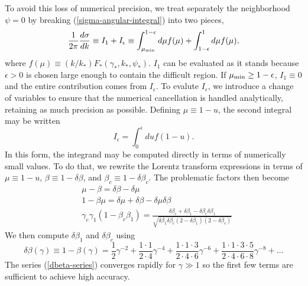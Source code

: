 \documentclass[12pt]{article}
\begin{document}
To avoid this loss of numerical precision, we treat
separately the neighborhood $\psi = 0$ by
breaking (\ref{sigma-angular-integral}) into two pieces,
\begin{equation}
  \frac{1}{2\pi}\frac{d\sigma}{dk} \equiv I_1 + I_\epsilon
  \equiv
   \int_{\mu_{\rm min}}^{1 - \epsilon} d\mu f(\mu)
   + \int_{1-\epsilon}^1 d\mu f(\mu),
\end{equation}
where $f(\mu) \equiv (k/k_*)F_*(\gamma_*, k_*, \psi_*)$. $I_1$
can be evaluated as it stands because $\epsilon > 0$ is chosen
large enough to contain the difficult region. If $\mu_{\rm min}
\geq 1 - \epsilon$, $I_1 \equiv 0$ and the entire contribution
comes from $I_\epsilon$. To evalute $I_\epsilon$, we introduce
a change of variables to ensure that the numerical cancellation
is handled analytically, retaining as much precision as
possible. Defining $\mu \equiv 1 - u$, the second integral may
be written
\begin{equation}
  I_\epsilon = \int_0^\epsilon du f(1-u).
\end{equation}
In this form, the integrand may be computed directly in terms of
numerically small values.  To do that, we rewrite the
Lorentz transform expressions in terms of $\mu \equiv 1-u$,
$\beta \equiv 1 - \delta\beta$, and
$\beta_c \equiv 1 - \delta\beta_c$.  The problematic factors
then become
\begin{eqnarray}
 &\mu - \beta = \delta\beta - \delta\mu \nonumber\\
 &1 - \beta\mu = \delta\mu + \delta\beta - \delta\mu\delta\beta \\
 &\gamma_c \gamma_1 (1 - \beta_c\beta_1) =
 \frac{\delta\beta_c + \delta\beta_1 - \delta\beta_c\delta\beta_1}{
\sqrt{\delta\beta_1\delta\beta_c(2-\delta\beta_1)(2-\delta\beta_c)}\nonumber
 }
\end{eqnarray}
We then compute $\delta\beta_1$ and $\delta\beta_c$
using
\begin{equation}
 \delta\beta(\gamma) \equiv 1 - \beta(\gamma) =
   \frac{1}{2}\gamma^{-2}
 + \frac{1\cdot 1}{2\cdot 4}\gamma^{-4}
 + \frac{1\cdot 1 \cdot 3}{2\cdot 4 \cdot 6}\gamma^{-6}
 + \frac{1\cdot 1 \cdot 3 \cdot 5}{2\cdot 4 \cdot 6 \cdot 8}\gamma^{-8}
 + \dots
\label{dbeta-series}
\end{equation}
The series
(\ref{dbeta-series}) converges
rapidly for $\gamma \gg 1$ so the first few terms are sufficient to achieve
high accuracy.
\end{document}
